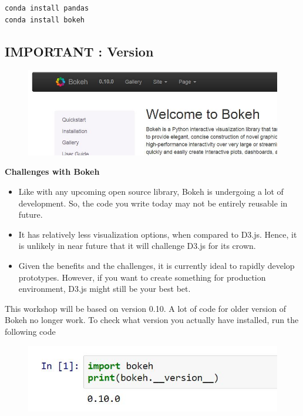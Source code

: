 \documentclass[a4paper,12pt]{article}
\begin{document}
\begin{framed}
\begin{verbatim}
conda install pandas
conda install bokeh
\end{verbatim}
\end{framed}

\subsection*{IMPORTANT : Version}

\begin{figure}[h!]
\centering
\includegraphics[width=0.7\linewidth]{images/00-BOKEH-version}
\end{figure}
\begin{framed}
	\noindent \textbf{Challenges with Bokeh}
	\begin{itemize}
		\item Like with any upcoming open source library, Bokeh is undergoing a lot of development. So, the code you write today may not be entirely reusable in future.
		
		\item  It has relatively less visualization options, when compared to D3.js. Hence, it is unlikely in near future that it will challenge D3.js for its crown.
		\item  Given the benefits and the challenges, it is currently ideal to rapidly develop prototypes. However, if you want to create something for production environment, D3.js might still be your best bet.
	\end{itemize}
\end{framed}
\newpage
\noindent This workshop will be based on version 0.10. A lot of code for older version of Bokeh no longer work.
To check what version you actually have installed, run the following code

\begin{figure}[h!]
\centering
\includegraphics[width=0.9\linewidth]{images/00-BOKEH-version-check}
\end{figure}

\end{document}
